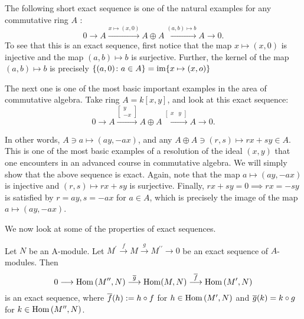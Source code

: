 \begin{example}
    The following short exact sequence is one of the natural examples for any commutative ring $A$ :
    $$
    0 \longrightarrow A \stackrel{x \mapsto(x, 0)}{\longrightarrow} A \oplus A \stackrel{(a, b) \mapsto b}{\longrightarrow} A \longrightarrow 0 .
    $$
    To see that this is an exact sequence, first notice that the map $x \mapsto(x, 0)$ is injective and the map $(a, b) \mapsto b$ is surjective. Further, the kernel of the map $(a, b) \mapsto b$ is precisely $\{(a,0)\colon a \in A\} = \operatorname{\text{im\/}}\{x \mapsto(x, o)\}$
\end{example}
 \begin{example}
     The next one is one of the most basic important examples in the area of commutative algebra. Take ring $A=k[x, y]$, and look at this exact sequence:
        $$
        0 \longrightarrow A \stackrel{\left[\begin{array}{c}
        y \\
        -x
        \end{array}\right]}{\longrightarrow} A \oplus A \stackrel{\left[\begin{array}{ll}
        x & y
        \end{array}\right]}{\longrightarrow} A \longrightarrow 0 .
        $$
        
        In other words, $A \ni a \mapsto(a y,-a x)$, and any $A \oplus A \ni (r, s) \mapsto r x+s y \in A$.
        This is one of the most basic examples of a resolution of the ideal $(x, y)$ that one encounters in an advanced course in commutative algebra. We will simply show that the above sequence is exact. Again, note that the map $a \mapsto(a y,-a x)$ is injective and $(r, s) \mapsto r x+s y$ is surjective. Finally, $r x+s y = 0 \implies rx = -sy$ is satisfied by $r=ay, s = -ax$ for $a \in A$, which is precisely the image of the map $a \mapsto(a y,-a x)$.
 \end{example}

We now look at some of the properties of exact sequences.
\begin{proposition}\label{prop: left-exact-hom}
       Let $N$ be an A-module. Let $M^{\prime} \stackrel{f}{\longrightarrow} M \stackrel{g}{\longrightarrow} M^{\prime \prime} \longrightarrow 0$ be an exact sequence of $A$-modules. Then
        $$
        0 \longrightarrow \operatorname{\text{Hom\/}}\left(M^{\prime \prime}, N\right) \stackrel{\overline{g}}{\longrightarrow} \operatorname{\text{Hom\/}}(M, N) \stackrel{\overline{f}}{\longrightarrow} \operatorname{\text{Hom\/}}\left(M^{\prime}, N\right)
        $$
        is an exact sequence, where $\overline{f}(h):= h \circ f$ for $h \in \operatorname{\text{Hom\/}}\left(M^{\prime}, N\right)$ and $\overline{g}(k) = k \circ g$ for $k \in \operatorname{\text{Hom\/}}\left(M^{\prime \prime}, N\right)$.
\end{proposition}

